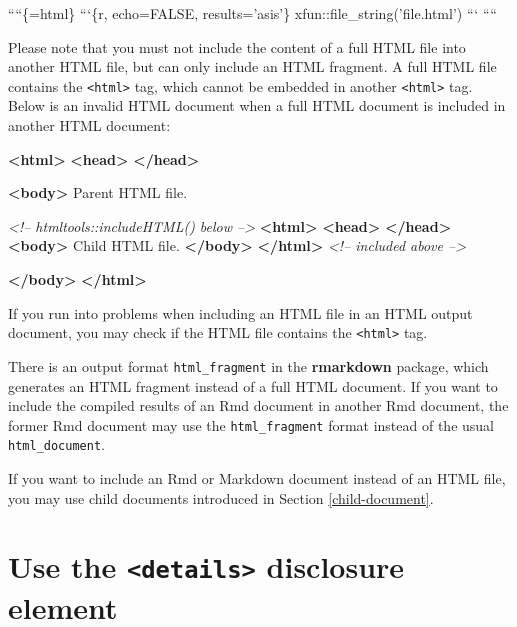 \documentclass[
  11pt,
]{krantz}
\newenvironment{Shaded}{\begin{snugshade}}{\end{snugshade}}
\newcommand{\BaseNTok}[1]{\textcolor[rgb]{0.06,0.06,0.06}{#1}}
\newcommand{\CommentTok}[1]{\textcolor[rgb]{0.37,0.37,0.37}{\textit{#1}}}
\newcommand{\KeywordTok}[1]{\textcolor[rgb]{0.27,0.27,0.27}{\textbf{#1}}}
\newcommand{\NormalTok}[1]{#1}
\begin{document}
\begin{Shaded}
\begin{Highlighting}[]
\BaseNTok{````\{=html\}}
\BaseNTok{```\{r, echo=FALSE, results='asis'\}}
\BaseNTok{xfun::file_string('file.html')}
\BaseNTok{```}
\BaseNTok{````}
\end{Highlighting}
\end{Shaded}

Please note that you must not include the content of a full HTML file into another HTML file, but can only include an HTML fragment. A full HTML file contains the \texttt{\textless{}html\textgreater{}} tag, which cannot be embedded in another \texttt{\textless{}html\textgreater{}} tag. Below is an invalid HTML document when a full HTML document is included in another HTML document:

\begin{Shaded}
\begin{Highlighting}[]
\KeywordTok{<html>}
  \KeywordTok{<head>}  \KeywordTok{</head>}

  \KeywordTok{<body>}
\NormalTok{  Parent HTML file.}
  
  \CommentTok{<!-- htmltools::includeHTML() below -->}
    \KeywordTok{<html>}
      \KeywordTok{<head>}  \KeywordTok{</head>}
      \KeywordTok{<body>}
\NormalTok{      Child HTML file.}
      \KeywordTok{</body>}
    \KeywordTok{</html>}
  \CommentTok{<!-- included above -->}

  \KeywordTok{</body>}
\KeywordTok{</html>}
\end{Highlighting}
\end{Shaded}

If you run into problems when including an HTML file in an HTML output document, you may check if the HTML file contains the \texttt{\textless{}html\textgreater{}} tag.

There is an output format \texttt{html\_fragment} in the \textbf{rmarkdown} package, which generates an HTML fragment instead of a full HTML document. If you want to include the compiled results of an Rmd document in another Rmd document, the former Rmd document may use the \texttt{html\_fragment} format instead of the usual \texttt{html\_document}.

If you want to include an Rmd or Markdown document instead of an HTML file, you may use child documents introduced in Section \ref{child-document}.

\hypertarget{details-tag}{%
\section{\texorpdfstring{Use the \texttt{\textless{}details\textgreater{}} disclosure element}{Use the \textless details\textgreater{} disclosure element}}\label{details-tag}}
\end{document}
